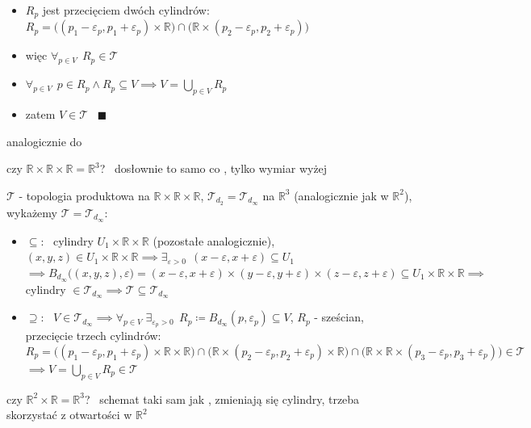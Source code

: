 \documentclass[a4paper,12pt]{article}
\begin{document}
\begin{itemize}
\begin{itemize}
        \item \(R_p\) jest przecięciem dwóch cylindrów: \, \(R_p = \big((p_1 - \varepsilon_p, p_1 + \varepsilon_p) \times \mathbb{R}\big) \cap \big(\mathbb{R} \times (p_2 - \varepsilon_p, p_2 + \varepsilon_p)\big)\)
        \item więc \(\forall_{p \in V} \;\, R_p \in \mathcal{T}\)
        \item \(\forall_{p \in V} \;\, p \in R_p \land R_p \subseteq V \implies V = \bigcup_{p \in V} R_p\)
        \item zatem \(V \in \mathcal{T}\) \, \(\blacksquare\)
    \end{itemize}
\end{itemize}

\bigskip
\zdc \; analogicznie do 
\begin{podpunkty}
    \item czy \(\mathbb{R} \times \mathbb{R} \times \mathbb{R} = \mathbb{R}^3\)? \, dosłownie to samo co , tylko wymiar wyżej

    \smallskip
    \(\mathcal{T}\) - topologia produktowa na \(\mathbb{R} \times \mathbb{R} \times \mathbb{R}\), \; \(\mathcal{T}_{d_2} = \mathcal{T}_{d_\infty}\) na \(\mathbb{R}^3\) (analogicznie jak w \(\mathbb{R}^2\)), \; wykażemy \(\mathcal{T} = \mathcal{T}_{d_\infty}\):
    \begin{itemize}
        \item \(\subseteq\): \, cylindry \(U_1 \times \mathbb{R} \times \mathbb{R}\) (pozostałe analogicznie), \; \((x, y, z) \in U_1 \times \mathbb{R} \times \mathbb{R} \implies \exists_{\varepsilon > 0} \;\, (x - \varepsilon, x + \varepsilon) \subseteq U_1\) \\
        \(\implies B_{d_\infty}\big((x, y, z), \varepsilon\big) = (x - \varepsilon, x + \varepsilon) \times (y - \varepsilon, y + \varepsilon) \times (z - \varepsilon, z + \varepsilon) \subseteq U_1 \times \mathbb{R} \times \mathbb{R} \implies\) cylindry \(\in \mathcal{T}_{d_\infty} \implies \mathcal{T} \subseteq \mathcal{T}_{d_\infty}\)
        \item \(\supseteq\): \, \(V \in \mathcal{T}_{d_\infty} \implies \forall_{p \in V} \; \exists_{\varepsilon_p > 0} \;\, R_p \coloneqq B_{d_\infty}(p, \varepsilon_p) \subseteq V\), \; \(R_p\) - sześcian, przecięcie trzech cylindrów:
        \[
        R_p = \big((p_1 - \varepsilon_p, p_1 + \varepsilon_p) \times \mathbb{R} \times \mathbb{R}\big) \cap \big(\mathbb{R} \times (p_2 - \varepsilon_p, p_2 + \varepsilon_p) \times \mathbb{R}\big) \cap \big(\mathbb{R} \times \mathbb{R} \times (p_3 - \varepsilon_p, p_3 + \varepsilon_p)\big) \in \mathcal{T}
        \]
        \(\implies V = \bigcup_{p \in V} R_p \in \mathcal{T}\)
    \end{itemize}
    \item czy \(\mathbb{R}^2 \times \mathbb{R} = \mathbb{R}^3\)? \, schemat taki sam jak , zmieniają się cylindry, trzeba skorzystać z otwartości w \(\mathbb{R}^2\)


\end{podpunkty}
\end{document}
